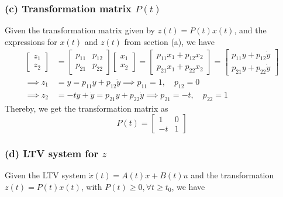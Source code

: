 \subsubsection*{(c) Transformation matrix \( P(t) \)}

Given the transformation matrix given by \( z(t) = P(t)x(t) \), and the expressions for \( x(t) \) and \( z(t) \) from section (a), we have
\begin{align*}
    \begin{bmatrix}
        z_1 \\
        z_2
    \end{bmatrix}
     & =
    \begin{bmatrix}
        p_{11} & p_{12} \\
        p_{21} & p_{22}
    \end{bmatrix}
    \begin{bmatrix}
        x_1 \\
        x_2
    \end{bmatrix}
    =
    \begin{bmatrix}
        p_{11} x_1 + p_{12} x_2 \\
        p_{21} x_1 + p_{22} x_2
    \end{bmatrix}
    =
    \begin{bmatrix}
        p_{11} y + p_{12} \dot y \\
        p_{21} y + p_{22} \dot y
    \end{bmatrix}
    \\
    \implies
    z_1
     & =
    y
    =
    p_{11} y + p_{12} \dot y
    \implies
    p_{11} = 1, \quad p_{12} = 0
    \\
    \implies
    z_2
     & =
    -t y + \dot y
    =
    p_{21} y + p_{22} \dot y
    \implies
    p_{21} = -t, \quad p_{22} = 1
\end{align*}
Thereby, we get the transformation matrix as
\begin{equation*}
    \boxed{
        P(t)
        =
        \begin{bmatrix}
            1  & 0 \\
            -t & 1
        \end{bmatrix}
    }
\end{equation*}

\clearpage
\subsubsection*{(d) LTV system for \( z \)}

Given the LTV system \( \dot{x}(t)=A(t) x+B(t) u \) and the transformation \( z(t)=P(t) x(t) \), with \( P(t) \geq 0, \forall t \geq t_{0} \), we have
